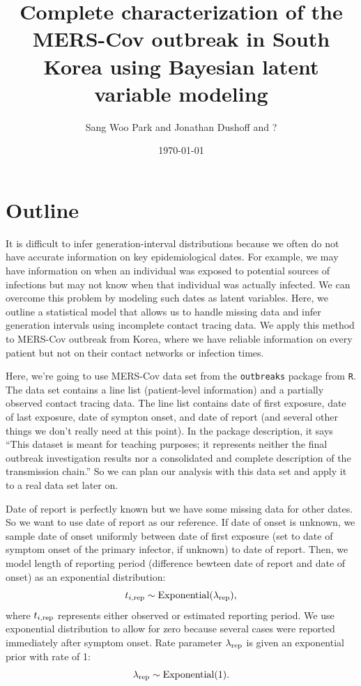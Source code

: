 \documentclass[12pt]{article}
\title{Complete characterization of the MERS-Cov outbreak in South Korea using Bayesian latent variable modeling}
\author{Sang Woo Park and Jonathan Dushoff and ?}
\date{\today}
\begin{document}
\maketitle

\section*{Outline}

It is difficult to infer generation-interval distributions because we often do not have accurate information on key epidemiological dates.
For example, we may have information on when an individual was exposed to potential sources of infections but may not know when that individual was actually infected.
We can overcome this problem by modeling such dates as latent variables.
Here, we outline a statistical model that allows us to handle missing data and infer generation intervals using incomplete contact tracing data.
We apply this method to MERS-Cov outbreak from Korea, where we have reliable information on every patient but not on their contact networks or infection times. 

Here, we're going to use MERS-Cov data set from the \texttt{outbreaks} package from \texttt{R}.
The data set contains a line list (patient-level information) and a partially observed contact tracing data.
The line list contains date of first exposure, date of last exposure, date of sympton onset, and date of report (and several other things we don't really need at this point).
In the package description, it says ``This dataset is meant for teaching purposes; it represents neither the final outbreak investigation results nor a consolidated and complete description of the transmission chain.''
So we can plan our analysis with this data set and apply it to a real data set later on.

Date of report is perfectly known but we have some missing data for other dates.
So we want to use date of report as our reference.
If date of onset is unknown, we sample date of onset uniformly between date of first exposure (set to date of symptom onset of the primary infector, if unknown) to date of report.
Then, we model length of reporting period (difference bewteen date of report and date of onset) as an exponential distribution:
\begin{equation}
t_{i, \tiny{\textrm{rep}}} \sim \mathrm{Exponential}(\lambda_{\tiny\textrm{rep}}),
\end{equation}
where $t_{i, \tiny\textrm{rep}}$ represents either observed or estimated reporting period.
We use exponential distribution to allow for zero because several cases were reported immediately after symptom onset.
Rate parameter $\lambda_{\tiny\textrm{rep}}$ is given an exponential prior with rate of 1:
\begin{equation}
\lambda_{\tiny\textrm{rep}} \sim \mathrm{Exponential}(1).
\end{equation}
\end{document}
